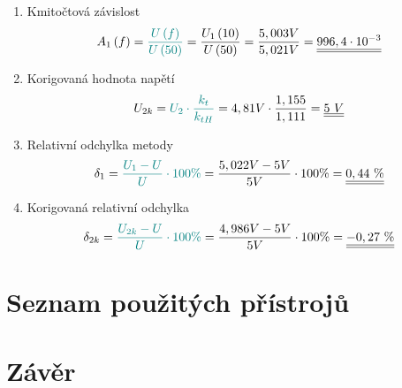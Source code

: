 \documentclass[a4paper, czech]{article}
\begin{document}
\begin{enumerate}
    \item Kmitočtová závislost
    \begin{multline*}
        A_1 \left(f\right) = \textcolor{teal}{\frac{U \left(f\right)}{U \left(50\right)}} = \frac{U_1 \left(10\right)}{U \left(50\right)} = \frac{5,003V}{5,021V} = \underline{\underline{996,4 \cdot 10^{-3}}} \hfill
    \end{multline*}
    \item Korigovaná hodnota napětí
    \begin{multline*}
        U_{2k} = \textcolor{teal}{U_2 \cdot \frac{k_t}{k_{tH}}} = 4,81V \cdot \frac{1,155}{1,111} = \underline{\underline{5\ V}} \hfill
    \end{multline*}
    \item Relativní odchylka metody
    \begin{multline*}
        \delta_1 = \textcolor{teal}{\frac{U_1 - U}{U} \cdot 100\%} = \frac{5,022V - 5V}{5V} \cdot 100 \% = \underline{\underline{0,44\ \%}} \hfill
    \end{multline*}
    \item Korigovaná relativní odchylka
    \begin{multline*}
        \delta_{2k} = \textcolor{teal}{\frac{U_{2k} - U}{U} \cdot 100\%} = \frac{4,986 V - 5V}{5V} \cdot 100 \% = \underline{\underline{-0,27\ \%}} \hfill
    \end{multline*}
\end{enumerate}

\section{Seznam použitých přístrojů}

\section{Závěr}
\end{document}

